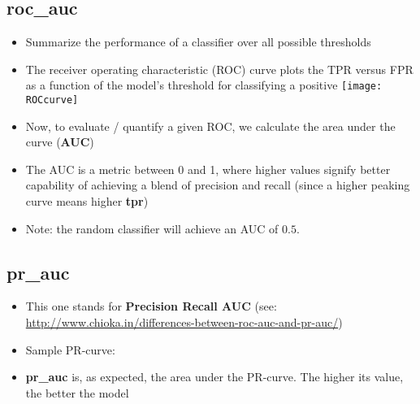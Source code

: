 \documentclass[12pt,a4paper]{article}
\begin{document}
\subsection{roc\_auc}
\begin{itemize}
\item Summarize the performance of a classifier over all possible thresholds
\item The receiver operating characteristic (ROC) curve plots the TPR versus FPR as a function of the model’s threshold for classifying a positive
\texttt{[image: ROCcurve]}
\item Now, to evaluate / quantify a given ROC, we calculate the area under the curve (\textbf{AUC})
\item The AUC is a metric between 0 and 1, where higher values signify better capability of achieving a blend of precision and recall (since a higher peaking curve means higher \textbf{tpr})
\item Note: the random classifier will achieve an AUC of $0.5$.
\end{itemize}
\subsection{pr\_auc}
\begin{itemize}
\item This one stands for \textbf{Precision Recall AUC} (see: \url{http://www.chioka.in/differences-between-roc-auc-and-pr-auc/})
\item Sample PR-curve: 
\item \textbf{pr\_auc} is, as expected, the area under the PR-curve. The higher its value, the better the model 
\end{itemize}
\end{document}
